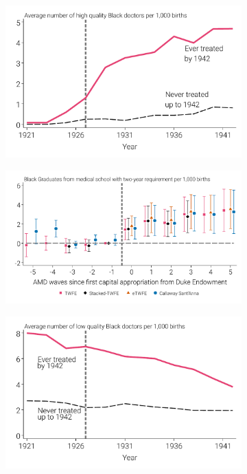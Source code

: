 \documentclass[12pt]{article}
\begin{document}
\begin{figure}
\begin{minipage}{\linewidth}
\begin{subfigure}[b]{0.49\columnwidth}
    \includegraphics[width=.9\linewidth]{../analysis/output/appendix/figure_c1a2_black_rMD_good_by_treatment_status.pdf}
  \end{subfigure}    
  \begin{subfigure}[b]{0.49\columnwidth}
    \includegraphics[width=\linewidth]{../analysis/output/appendix/figure_c1b2_good_black_doctors_first_stage.pdf}
  \end{subfigure}  
  \begin{subfigure}[b]{0.49\columnwidth}
    \includegraphics[width=.9\linewidth]{../analysis/output/appendix/figure_c1a3_black_rMD_bad_by_treatment_status.pdf}

\end{subfigure}
\end{minipage}
\end{figure}
\end{document}
